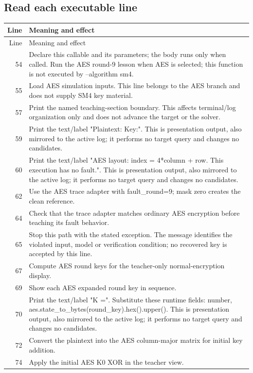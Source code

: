 \subsection*{Read each executable line}
\begingroup\small\begin{longtable}{r >{\raggedright\arraybackslash}p{138mm}}\toprule Line&Meaning and effect\\\midrule\endfirsthead\toprule Line&Meaning and effect\\\midrule\endhead
54&Declare this callable and its parameters; the body runs only when called. Run the AES round-9 lesson when AES is selected; this function is not executed by --algorithm sm4.\\
55&Load AES simulation inputs. This line belongs to the AES branch and does not supply SM4 key material.\\
57&Print the named teaching-section boundary. This affects terminal/log organization only and does not advance the target or the solver.\\
59&Print the text/label "Plaintext:  Key:". This is presentation output, also mirrored to the active log; it performs no target query and changes no candidates.\\
60&Print the text/label "AES layout: index = 4*column + row. This execution has no fault.". This is presentation output, also mirrored to the active log; it performs no target query and changes no candidates.\\
62&Use the AES trace adapter with fault\_round=9; mask zero creates the clean reference.\\
64&Check that the trace adapter matches ordinary AES encryption before teaching its fault behavior.\\
65&Stop this path with the stated exception. The message identifies the violated input, model or verification condition; no recovered key is accepted by this line.\\
67&Compute AES round keys for the teacher-only normal-encryption display.\\
69&Show each AES expanded round key in sequence.\\
70&Print the text/label "K  =". Substitute these runtime fields: number, aes.state\_to\_bytes(round\_key).hex().upper(). This is presentation output, also mirrored to the active log; it performs no target query and changes no candidates.\\
72&Convert the plaintext into the AES column-major matrix for initial key addition.\\
74&Apply the initial AES K0 XOR in the teacher view.\\

\end{longtable}
